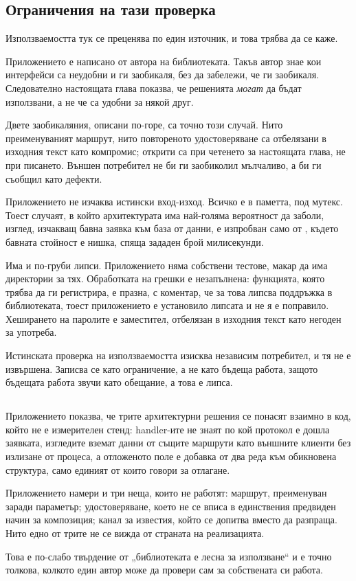 \subsection{Ограничения на тази проверка}
\label{ssec:app-limits}

Използваемостта тук се преценява по един източник, и това трябва да се каже.

Приложението е написано от автора на библиотеката. Такъв автор знае кои интерфейси са
неудобни и ги заобикаля, без да забележи, че ги заобикаля. Следователно настоящата глава
показва, че решенията \emph{могат} да бъдат използвани, а не че са удобни за някой друг.

Двете заобикаляния, описани по-горе, са точно този случай. Нито преименуваният маршрут,
нито повтореното удостоверяване са отбелязани в изходния текст като компромис; открити са
при четенето за настоящата глава, не при писането. Външен потребител не би ги заобиколил
мълчаливо, а би ги съобщил като дефекти.

Приложението не изчаква истински вход-изход. Всичко е в паметта, под мутекс. Тоест случаят,
в който архитектурата има най-голяма вероятност да заболи, изглед, изчакващ бавна заявка
към база от данни, е изпробван само от , където бавната стойност е
нишка, спяща зададен брой милисекунди.

Има и по-груби липси. Приложението няма собствени тестове, макар да има директории за тях.
Обработката на грешки е незапълнена: функцията, която трябва да ги регистрира, е празна, с
коментар, че за това липсва поддръжка в библиотеката, тоест приложението е установило
липсата и не я е поправило. Хеширането на паролите е заместител, отбелязан в изходния текст
като негоден за употреба.

Истинската проверка на използваемостта изисква независим потребител, и тя не е извършена.
Записва се като ограничение, а не като бъдеща работа, защото бъдещата работа звучи като
обещание, а това е липса.

\subsection{}

Приложението показва, че трите архитектурни решения се понасят взаимно в код, който не е
измерителен стенд: handler-ите не знаят по кой протокол е дошла заявката, изгледите вземат
данни от същите маршрути като външните клиенти без излизане от процеса, а отложеното поле е
добавка от два реда към обикновена структура, само единият от които говори за отлагане.

Приложението намери и три неща, които не работят: маршрут, преименуван заради параметър;
удостоверяване, което не се вписа в единствения предвиден начин за композиция; канал за
известия, който се допитва вместо да разпраща. Нито едно от трите не се вижда от страната
на реализацията.

Това е по-слабо твърдение от „библиотеката е лесна за използване“ и е точно толкова,
колкото един автор може да провери сам за собствената си работа.

